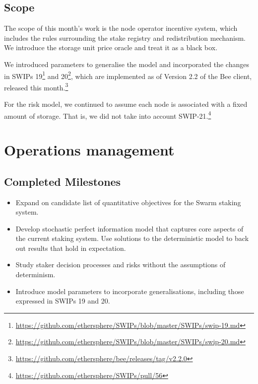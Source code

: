 \subsection*{Scope}

The scope of this month's work is the node operator incentive system, which includes the rules surrounding the stake registry and redistribution mechanism. 
%
We introduce the storage unit price oracle and treat it as a black box.

We introduced parameters to generalise the model and incorporated the changes in SWIPs 19\footnote{\url{https://github.com/ethersphere/SWIPs/blob/master/SWIPs/swip-19.md}} and 20\footnote{\url{https://github.com/ethersphere/SWIPs/blob/master/SWIPs/swip-20.md}}, which are implemented as of Version 2.2 of the Bee client, released this month.\footnote{\url{https://github.com/ethersphere/bee/releases/tag/v2.2.0}}

For the risk model, we continued to assume each node is associated with a fixed amount of storage. That is, we did not take into account SWIP-21.\footnote{\url{https://github.com/ethersphere/SWIPs/pull/56}}

\section*{Operations management}

\subsection*{Completed Milestones}

\begin{itemize}
  \item 
    Expand on candidate list of quantitative objectives for the Swarm staking system.
  \item 
    Develop stochastic perfect information model that captures core aspects of the current staking system. 
    Use solutions to the deterministic model to back out results that hold in expectation.

  \item Study staker decision processes and risks without the assumptions of determinism.

  \item Introduce model parameters to incorporate generalisations, including those expressed in SWIPs 19 and 20.
\end{itemize}

